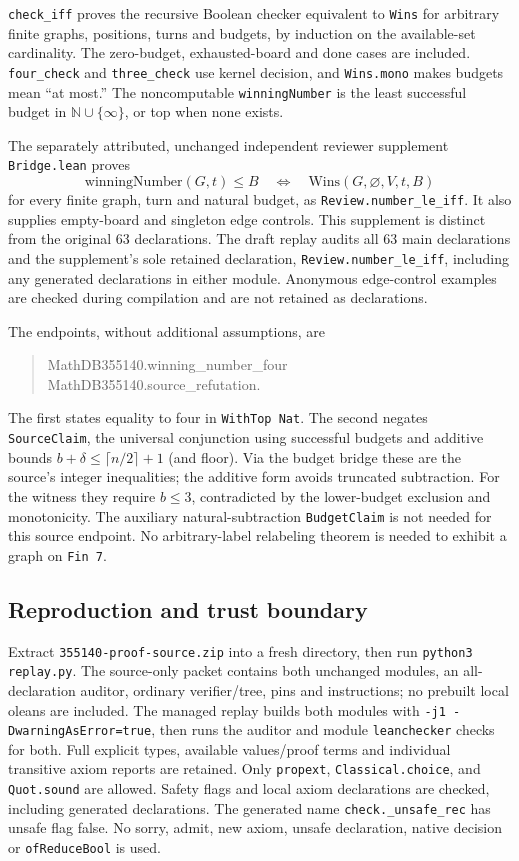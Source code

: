 \documentclass[11pt]{article}
\begin{document}
\texttt{check\_iff} proves the recursive Boolean checker equivalent to \texttt{Wins} for arbitrary finite graphs, positions, turns and budgets, by induction on the available-set cardinality. The zero-budget, exhausted-board and done cases are included. \texttt{four\_check} and \texttt{three\_check} use kernel decision, and \texttt{Wins.mono} makes budgets mean ``at most.'' The noncomputable \texttt{winningNumber} is the least successful budget in $\mathbb N\cup\{\infty\}$, or top when none exists.

The separately attributed, unchanged independent reviewer supplement \texttt{Bridge.lean} proves
\[
\mathrm{winningNumber}(G,t)\le B
\quad\Longleftrightarrow\quad
\mathrm{Wins}(G,\varnothing,V,t,B)
\]
for every finite graph, turn and natural budget, as \texttt{Review.number\_le\_iff}. It also supplies empty-board and singleton edge controls. This supplement is distinct from the original 63 declarations. The draft replay audits all 63 main declarations and the supplement's sole retained declaration, \texttt{Review.number\_le\_iff}, including any generated declarations in either module. Anonymous edge-control examples are checked during compilation and are not retained as declarations.

The endpoints, without additional assumptions, are
\begin{quote}\ttfamily
MathDB355140.winning\_number\_four\\
MathDB355140.source\_refutation.
\end{quote}
The first states equality to four in \texttt{WithTop Nat}. The second negates \texttt{SourceClaim}, the universal conjunction using successful budgets and additive bounds $b+\delta\le\lceil n/2\rceil+1$ (and floor). Via the budget bridge these are the source's integer inequalities; the additive form avoids truncated subtraction. For the witness they require $b\le3$, contradicted by the lower-budget exclusion and monotonicity. The auxiliary natural-subtraction \texttt{BudgetClaim} is not needed for this source endpoint. No arbitrary-label relabeling theorem is needed to exhibit a graph on \texttt{Fin 7}.

\subsection{Reproduction and trust boundary}
Extract \texttt{355140-proof-source.zip} into a fresh directory, then run \texttt{python3 replay.py}. The source-only packet contains both unchanged modules, an all-declaration auditor, ordinary verifier/tree, pins and instructions; no prebuilt local oleans are included. The managed replay builds both modules with \texttt{-j1 -DwarningAsError=true}, then runs the auditor and module \texttt{leanchecker} checks for both. Full explicit types, available values/proof terms and individual transitive axiom reports are retained. Only \texttt{propext}, \texttt{Classical.choice}, and \texttt{Quot.sound} are allowed. Safety flags and local axiom declarations are checked, including generated declarations. The generated name \texttt{check.\_unsafe\_rec} has unsafe flag false. No sorry, admit, new axiom, unsafe declaration, native decision or \texttt{ofReduceBool} is used.
\end{document}
